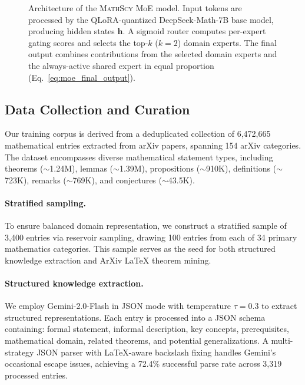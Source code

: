 \documentclass[11pt,a4paper]{article}
\newcommand{\mathscy}{\textsc{MathScy}}
\begin{document}
\begin{figure}[t]
\caption{Architecture of the \mathscy{} MoE model. Input tokens are processed by the QLoRA-quantized DeepSeek-Math-7B base model, producing hidden states $\mathbf{h}$. A sigmoid router computes per-expert gating scores and selects the top-$k$ ($k{=}2$) domain experts. The final output combines contributions from the selected domain experts and the always-active shared expert in equal proportion (Eq.~\ref{eq:moe_final_output}).}
\label{fig:moe_architecture}
\end{figure}

\subsection{Data Collection and Curation}
\label{sec:data_method}

Our training corpus is derived from a deduplicated collection of 6,472,665 mathematical entries extracted from arXiv papers, spanning 154 arXiv categories. The dataset encompasses diverse mathematical statement types, including theorems (${\sim}$1.24M), lemmas (${\sim}$1.39M), propositions (${\sim}$910K), definitions (${\sim}$723K), remarks (${\sim}$769K), and conjectures (${\sim}$43.5K).

\paragraph{Stratified sampling.}
To ensure balanced domain representation, we construct a stratified sample of 3,400 entries via reservoir sampling, drawing 100 entries from each of 34 primary mathematics categories. This sample serves as the seed for both structured knowledge extraction and ArXiv LaTeX theorem mining.

\paragraph{Structured knowledge extraction.}
We employ Gemini-2.0-Flash in JSON mode with temperature $\tau{=}0.3$ to extract structured representations. Each entry is processed into a JSON schema containing: formal statement, informal description, key concepts, prerequisites, mathematical domain, related theorems, and potential generalizations. A multi-strategy JSON parser with LaTeX-aware backslash fixing handles Gemini's occasional escape issues, achieving a 72.4\% successful parse rate across 3,319 processed entries.
\end{document}
